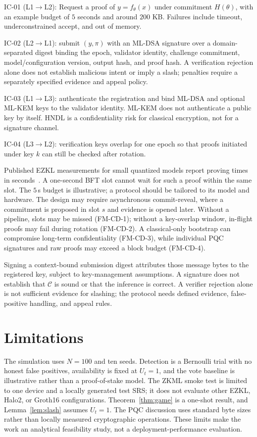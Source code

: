 \documentclass[conference]{IEEEtran}
\begin{document}
IC-01 (L1$\to$L2): Request a proof of $y=f_\theta(x)$ under commitment $H(\theta)$, with an example budget of $5$ seconds and around $200$ KB.
Failures include timeout, underconstrained accept, and out of memory.

IC-02 (L2$\to$L1): submit $(y,\pi)$ with an ML-DSA signature over a domain-separated digest binding the epoch, validator identity, challenge commitment, model/configuration version, output hash, and proof hash. A verification rejection alone does not establish malicious intent or imply a slash; penalties require a separately specified evidence and appeal policy.

IC-03 (L1$\to$L3): authenticate the registration and bind ML-DSA and optional ML-KEM keys to the validator identity. ML-KEM does not authenticate a public key by itself. HNDL is a confidentiality risk for classical encryption, not for a signature channel.

IC-04 (L3$\to$L2): verification keys overlap for one epoch so that proofs initiated under key $k$ can still be checked after rotation.

Published EZKL measurements for small quantized models report proving times in seconds~\cite{ezkl2024}. A one-second BFT slot cannot wait for such a proof within the same slot. The $5$\,s budget is illustrative; a protocol should be tailored to its model and hardware. The design may require asynchronous commit-reveal, where a commitment is proposed in slot $s$ and evidence is opened later. Without a pipeline, slots may be missed (FM-CD-1); without a key-overlap window, in-flight proofs may fail during rotation (FM-CD-2). A classical-only bootstrap can compromise long-term confidentiality (FM-CD-3), while individual PQC signatures and raw proofs may exceed a block budget (FM-CD-4).


Signing a context-bound submission digest attributes those message bytes to the registered key, subject to key-management assumptions. A signature does not establish that $\mathcal{C}$ is sound or that the inference is correct. A verifier rejection alone is not sufficient evidence for slashing; the protocol needs defined evidence, false-positive handling, and appeal rules.

\section{Limitations}
\label{sec:limits}

The simulation uses $N=100$ and ten seeds. Detection is a Bernoulli trial with no honest false positives, availability is fixed at $U_t=1$, and the vote baseline is illustrative rather than a proof-of-stake model. The ZKML smoke test is limited to one device and a locally generated test SRS; it does not evaluate other EZKL, Halo2, or Groth16 configurations. Theorem~\ref{thm:game} is a one-shot result, and Lemma~\ref{lem:slash} assumes $U_t=1$. The PQC discussion uses standard byte sizes rather than locally measured cryptographic operations. These limits make the work an analytical feasibility study, not a deployment-performance evaluation.
\end{document}

